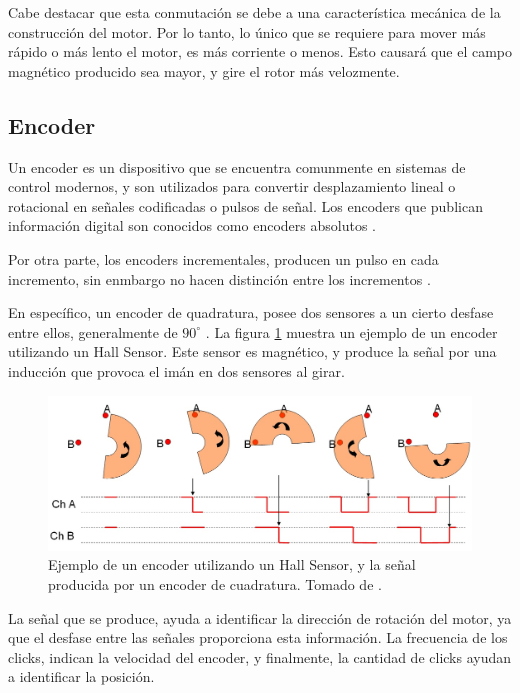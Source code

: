 Cabe destacar que esta conmutación se debe a una característica mecánica de la construcción del motor. Por lo tanto, lo único que se requiere para mover más rápido o más lento el motor, es más corriente o menos. Esto causará que el campo magnético producido sea mayor, y gire el rotor más velozmente.

\subsection{Encoder}
Un encoder es un dispositivo que se encuentra comunmente en sistemas de control modernos, y son utilizados para convertir desplazamiento lineal o rotacional en señales codificadas o pulsos de señal. Los encoders que publican información digital son conocidos como encoders absolutos \cite{Golnaraghi2017}.

Por otra parte, los encoders incrementales, producen un pulso en cada incremento, sin enmbargo no hacen distinción entre los incrementos \cite{Golnaraghi2017}.

En específico, un encoder de quadratura, posee dos sensores a un cierto desfase entre ellos, generalmente de $90^\circ$ . La figura \ref{F:encoder} muestra un ejemplo de un encoder utilizando un Hall Sensor. Este sensor es magnético, y produce la señal por una inducción que provoca el imán en dos sensores al girar.

\begin{figure}[H]
\centering
\includegraphics[scale=0.3]{imagenes/quad1.jpg}
\caption{Ejemplo de un encoder utilizando un Hall Sensor, y la señal producida por un encoder de cuadratura. Tomado de \cite{Golnaraghi2017}.}
\label{F:encoder}
\end{figure}

La señal que se produce, ayuda a identificar la dirección de rotación del motor, ya que el desfase entre las señales proporciona esta información. La frecuencia de los clicks, indican la velocidad del encoder, y finalmente, la cantidad de clicks ayudan a identificar la posición.

